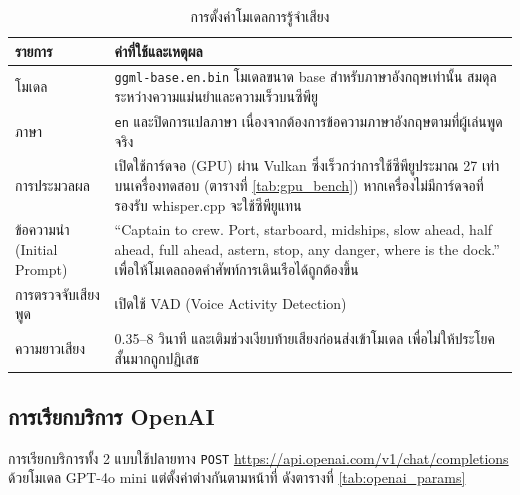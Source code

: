 \begin{table}[!htbp]
\centering
\caption{การตั้งค่าโมเดลการรู้จำเสียง}
\label{tab:whisper_config}
\begin{tabular}{|L{4.00cm}|L{9.70cm}|}
\hline
\textbf{รายการ} & \textbf{ค่าที่ใช้และเหตุผล} \\
\hline
โมเดล & \texttt{ggml-base.\allowbreak en.\allowbreak bin} โมเดลขนาด base สำหรับภาษาอังกฤษเท่านั้น สมดุลระหว่างความแม่นยำและความเร็วบนซีพียู \\ \hline
ภาษา & \texttt{en} และปิดการแปลภาษา เนื่องจากต้องการข้อความภาษาอังกฤษตามที่ผู้เล่นพูดจริง \\ \hline
การประมวลผล & เปิดใช้การ์ดจอ (GPU) ผ่าน Vulkan ซึ่งเร็วกว่าการใช้ซีพียูประมาณ 27 เท่าบนเครื่องทดสอบ (ตารางที่ \ref{tab:gpu_bench}) หากเครื่องไม่มีการ์ดจอที่รองรับ whisper.cpp จะใช้ซีพียูแทน \\ \hline
ข้อความนำ (Initial Prompt) & ``Captain to crew. Port, starboard, midships, slow ahead, half ahead, full ahead, astern, stop, any danger, where is the dock.'' เพื่อให้โมเดลถอดคำศัพท์การเดินเรือได้ถูกต้องขึ้น \\ \hline
การตรวจจับเสียงพูด & เปิดใช้ VAD (Voice Activity Detection) \\ \hline
ความยาวเสียง & 0.35--8 วินาที และเติมช่วงเงียบท้ายเสียงก่อนส่งเข้าโมเดล เพื่อไม่ให้ประโยคสั้นมากถูกปฏิเสธ \\
\hline
\end{tabular}
\end{table}

\subsection{การเรียกบริการ OpenAI}

การเรียกบริการทั้ง 2 แบบใช้ปลายทาง \texttt{POST} \url{https://api.openai.com/v1/chat/completions} ด้วยโมเดล GPT-4o mini แต่ตั้งค่าต่างกันตามหน้าที่ ดังตารางที่ \ref{tab:openai_params}

